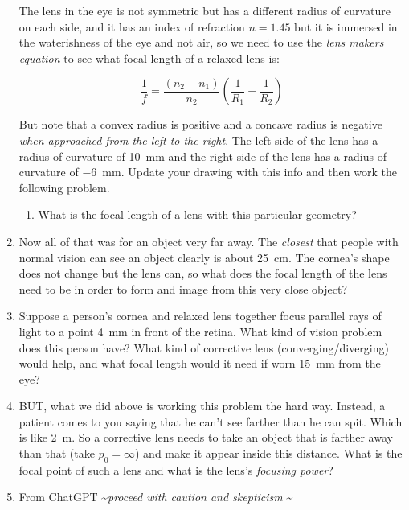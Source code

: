 \begin{enumerate}
The lens in the eye is not symmetric but has a different radius of curvature on each side, and it has an index of refraction $n=1.45$ but it is immersed in the waterishness of the eye and not air, so we need to use the \emph{lens makers equation} to see what focal length of a relaxed lens is:

\[\frac{1}{f} = \frac{\left(n_2-n_1\right)}{n_2}\left(\frac{1}{R_1}-\frac{1}{R_2}\right)\]

But note that a convex radius is positive and a concave radius is negative \emph{when approached from the left to the right}. 
The left side of the lens has a radius of curvature of \SI{+10}{mm} and the right side of the lens has a radius of curvature of \SI{-6}{mm}. Update your drawing with this info and then work the following problem.

\begin{enumerate}
	\setcounter{enumii}{\value{saveenum}}
	\setlength\itemsep{2 in}
	\item What is the focal length of a lens with this particular geometry?
\end{enumerate}

\item 
Now all of that was for an object very far away. The \emph{closest} that people with normal vision can see an object clearly is about \SI{25}{cm}. The cornea's shape does not change but the lens can, so what does the focal length of the lens need to be in order to form and image from this very close object?

\item
Suppose a person’s cornea and relaxed lens together focus parallel rays of light to a point \SI{4}{mm} in front of the retina. What kind of vision problem does this person have? What kind of corrective lens (converging/diverging) would help, and what focal length would it need if worn \SI{15}{mm} from the eye?

\item BUT, what we did above is working this problem the hard way. Instead, a patient comes to you saying that he can't see farther than he can spit. Which is like \SI{2}{\meter}. So a corrective lens needs to take an object that is farther away than that (take $p_0 = \infty$) and make it appear inside this distance. What is the focal point of such a lens and what is the lens's \emph{focusing power}?
\bigskip

\item From ChatGPT \textasciitilde \emph{proceed with caution and skepticism} \textasciitilde


\end{enumerate}
